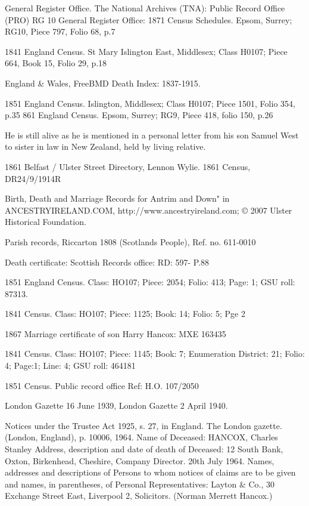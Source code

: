 \begin{thebibliography}{99}
	General Register Office. The National Archives (TNA): Public Record Office (PRO) RG 10 General Register Office: 1871 Census Schedules.
	Epsom, Surrey; RG10, Piece 797, Folio 68, p.7
	
	1841 England Census.
	St Mary Islington East, Middlesex; Class H0107; Piece 664, Book 15, Folio 29, p.18
	
	England & Wales, FreeBMD Death Index: 1837-1915.
	
	1851 England Census.
	Islington, Middlesex; Class H0107; Piece 1501, Folio 354, p.35
	861 England Census.
	Epsom, Surrey; RG9, Piece 418, folio 150, p.26
	
	He is still alive as he is mentioned in a personal letter from his son Samuel West to sister in law
	in New Zealand, held by living relative.
	
	 1861 Belfast / Ulster Street Directory, Lennon Wylie. 
	 1861 Census, DR24/9/1914R 
	 
	Birth, Death and Marriage Records for Antrim and Down" in ANCESTRYIRELAND.COM, 
	http://www.ancestryireland.com; © 2007 Ulster Historical Foundation. 
	
	Parish records, Riccarton 1808 (Scotlands People), Ref. no. 611-0010
	
	Death certificate: Scottish Records office: RD: 597- P.88 
	
	1851 England Census.
	Class: HO107; Piece: 2054; Folio: 413; Page: 1; GSU roll: 87313.
	
	1841 Census.
	Class: HO107; Piece: 1125; Book: 14; Folio: 5; Pge 2
	
	1867 Marriage certificate of son Harry Hancox: MXE 163435 
	
	1841 Census.
	Class: HO107; Piece: 1145; Book: 7; Enumeration District: 21; Folio: 4; Page:1; Line: 4; GSU roll: 464181
	
	1851 Census.
	Public record office Ref: H.O. 107/2050
	
	London Gazette 16 June 1939, London Gazette 2 April 1940.
	
	Notices under the Trustee Act 1925, s. 27, in England. The London gazette. (London, England), p. 10006, 1964.
	Name of Deceased: HANCOX, Charles Stanley
	Address, description and date of death of Deceased:
	12 South Bank, Oxton, Birkenhead, Cheshire, Company Director. 20th July 1964.
	Names, addresses and descriptions of Persons to whom notices of claims are to be given and names, in parentheses, of Personal Representatives:
	Layton & Co., 30 Exchange Street East, Liverpool 2, Solicitors. (Norman Merrett Hancox.)


\end{thebibliography}
